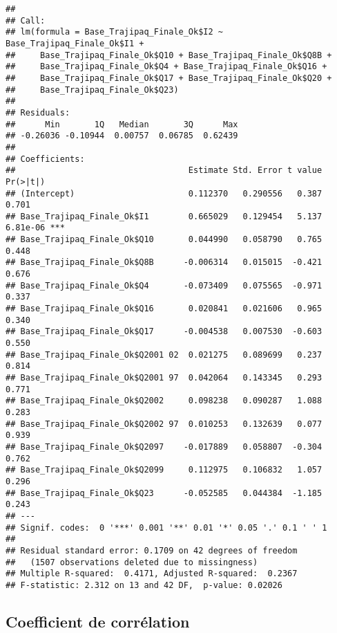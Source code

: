 \documentclass[
]{article}
\newenvironment{Shaded}{\begin{snugshade}}{\end{snugshade}}
\newcommand{\FunctionTok}[1]{\textcolor[rgb]{0.00,0.00,0.00}{#1}}
\newcommand{\NormalTok}[1]{#1}
\newcommand{\SpecialCharTok}[1]{\textcolor[rgb]{0.00,0.00,0.00}{#1}}
\begin{document}
\begin{verbatim}
## 
## Call:
## lm(formula = Base_Trajipaq_Finale_Ok$I2 ~ Base_Trajipaq_Finale_Ok$I1 + 
##     Base_Trajipaq_Finale_Ok$Q10 + Base_Trajipaq_Finale_Ok$Q8B + 
##     Base_Trajipaq_Finale_Ok$Q4 + Base_Trajipaq_Finale_Ok$Q16 + 
##     Base_Trajipaq_Finale_Ok$Q17 + Base_Trajipaq_Finale_Ok$Q20 + 
##     Base_Trajipaq_Finale_Ok$Q23)
## 
## Residuals:
##      Min       1Q   Median       3Q      Max 
## -0.26036 -0.10944  0.00757  0.06785  0.62439 
## 
## Coefficients:
##                                   Estimate Std. Error t value Pr(>|t|)    
## (Intercept)                       0.112370   0.290556   0.387    0.701    
## Base_Trajipaq_Finale_Ok$I1        0.665029   0.129454   5.137 6.81e-06 ***
## Base_Trajipaq_Finale_Ok$Q10       0.044990   0.058790   0.765    0.448    
## Base_Trajipaq_Finale_Ok$Q8B      -0.006314   0.015015  -0.421    0.676    
## Base_Trajipaq_Finale_Ok$Q4       -0.073409   0.075565  -0.971    0.337    
## Base_Trajipaq_Finale_Ok$Q16       0.020841   0.021606   0.965    0.340    
## Base_Trajipaq_Finale_Ok$Q17      -0.004538   0.007530  -0.603    0.550    
## Base_Trajipaq_Finale_Ok$Q2001 02  0.021275   0.089699   0.237    0.814    
## Base_Trajipaq_Finale_Ok$Q2001 97  0.042064   0.143345   0.293    0.771    
## Base_Trajipaq_Finale_Ok$Q2002     0.098238   0.090287   1.088    0.283    
## Base_Trajipaq_Finale_Ok$Q2002 97  0.010253   0.132639   0.077    0.939    
## Base_Trajipaq_Finale_Ok$Q2097    -0.017889   0.058807  -0.304    0.762    
## Base_Trajipaq_Finale_Ok$Q2099     0.112975   0.106832   1.057    0.296    
## Base_Trajipaq_Finale_Ok$Q23      -0.052585   0.044384  -1.185    0.243    
## ---
## Signif. codes:  0 '***' 0.001 '**' 0.01 '*' 0.05 '.' 0.1 ' ' 1
## 
## Residual standard error: 0.1709 on 42 degrees of freedom
##   (1507 observations deleted due to missingness)
## Multiple R-squared:  0.4171, Adjusted R-squared:  0.2367 
## F-statistic: 2.312 on 13 and 42 DF,  p-value: 0.02026
\end{verbatim}

\hypertarget{coefficient-de-corruxe9lation}{%
\subsection{Coefficient de
corrélation}\label{coefficient-de-corruxe9lation}}

\begin{Shaded}
\end{Shaded}
\end{document}
